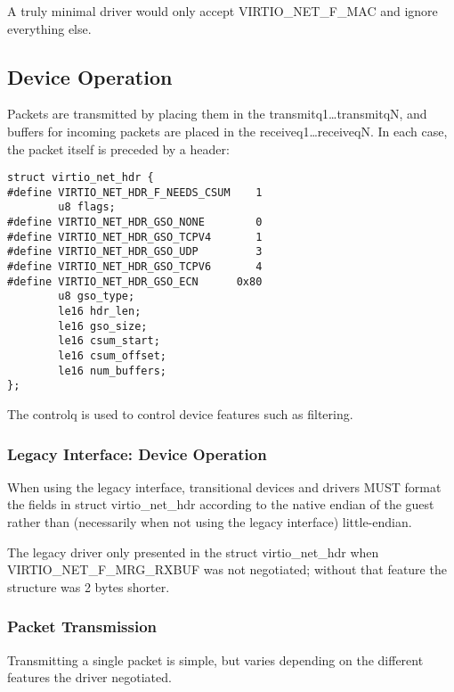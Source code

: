 A truly minimal driver would only accept VIRTIO_NET_F_MAC and ignore
everything else.

\subsection{Device Operation}\label{sec:Device Types / Network Device / Device Operation}

Packets are transmitted by placing them in the
transmitq1\ldots transmitqN, and buffers for incoming packets are
placed in the receiveq1\ldots receiveqN. In each case, the packet
itself is preceded by a header:

\begin{lstlisting}
struct virtio_net_hdr {
#define VIRTIO_NET_HDR_F_NEEDS_CSUM    1
        u8 flags;
#define VIRTIO_NET_HDR_GSO_NONE        0
#define VIRTIO_NET_HDR_GSO_TCPV4       1
#define VIRTIO_NET_HDR_GSO_UDP         3
#define VIRTIO_NET_HDR_GSO_TCPV6       4
#define VIRTIO_NET_HDR_GSO_ECN      0x80
        u8 gso_type;
        le16 hdr_len;
        le16 gso_size;
        le16 csum_start;
        le16 csum_offset;
        le16 num_buffers;
};
\end{lstlisting}

The controlq is used to control device features such as
filtering.

\subsubsection{Legacy Interface: Device Operation}\label{sec:Device Types / Network Device / Device Operation / Legacy Interface: Device Operation}
When using the legacy interface, transitional devices and drivers
MUST format the fields in struct virtio_net_hdr
according to the native endian of the guest rather than
(necessarily when not using the legacy interface) little-endian.

The legacy driver only presented  in the struct virtio_net_hdr
when VIRTIO_NET_F_MRG_RXBUF was not negotiated; without that feature the
structure was 2 bytes shorter.

\subsubsection{Packet Transmission}\label{sec:Device Types / Network Device / Device Operation / Packet Transmission}

Transmitting a single packet is simple, but varies depending on
the different features the driver negotiated.

